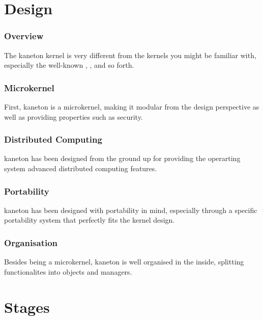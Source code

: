 %
%

\section{Design}


\begin{frame}
  \frametitle{Overview}

  The kaneton kernel is very different from the kernels you might be
  familiar with, especially the well-known , ,
   and so forth.
\end{frame}


\begin{frame}
  \frametitle{Microkernel}

  First, kaneton is a microkernel, making it modular from the design
  perspective as well as providing properties such as security.
\end{frame}


\begin{frame}
  \frametitle{Distributed Computing}

  kaneton has been designed from the ground up for providing the operarting
  system advanced distributed computing features.
\end{frame}


\begin{frame}
  \frametitle{Portability}

  kaneton has been designed with portability in mind, especially through
  a specific portability system that perfectly fits the kernel design.
\end{frame}


\begin{frame}
  \frametitle{Organisation}

  Besides being a microkernel, kaneton is well organised in the inside,
  splitting functionalites into objects and managers.
\end{frame}

%
%

\section{Stages}


